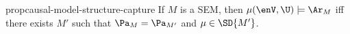 {%
\begin{linked}{prop}{causal-model-structure-capture}
    If $M$ is a SEM, then
    $\mu(\enV,\U) \models \Ar_{M}$ 
        iff
        there exists $M'$ such that $\Pa_M = \Pa_{M'}$ and
        $\mu \in \SD{M'}$.
\end{linked}


}
